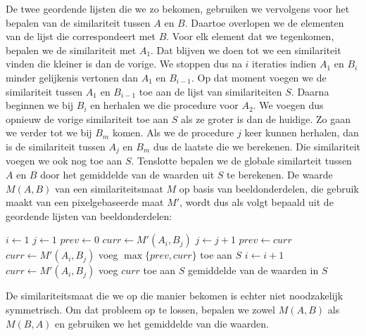 De twee geordende lijsten die we zo bekomen, gebruiken we vervolgens voor het bepalen van 
de similariteit tussen $A$ en $B$. Daartoe overlopen we de elementen van de 
lijst die correspondeert met $B$. Voor
elk element dat we tegenkomen, bepalen we de similariteit met $A_1$. Dat blijven we doen
tot we een similariteit vinden die kleiner is dan de vorige. We stoppen dus na $i$ iteraties 
indien $A_1$ en $B_i$ minder gelijkenis vertonen dan $A_1$ en $B_{i-1}$. Op dat moment voegen
we de similariteit tussen $A_1$ en $B_{i-1}$ toe aan de lijst van similariteiten $S$. Daarna
beginnen we bij $B_i$ en herhalen we die procedure voor $A_2$. We voegen dus opnieuw de vorige
similariteit toe aan $S$ als ze groter is dan de huidige. Zo gaan we verder tot we bij
$B_m$ komen. Als we de procedure $j$ keer kunnen herhalen, dan
is de similariteit tussen $A_j$ en $B_m$ dus de laatste die we berekenen. Die similariteit
voegen we ook nog toe aan $S$. Tenslotte bepalen we de globale similarteit tussen $A$ en $B$ 
door het gemiddelde van de waarden uit $S$ te berekenen. De waarde $M(A,B)$ van een 
similariteitsmaat $M$ op basis van beeldonderdelen, die gebruik maakt van een 
pixelgebaseerde maat $M'$, wordt dus als volgt bepaald uit de geordende lijsten van
beeldonderdelen:
\begin{multicols}{2}
\begin{algorithmic}[1]
\STATE $i \leftarrow 1$
\STATE $j \leftarrow 1$
\STATE $prev \leftarrow 0$
\STATE $curr \leftarrow M'(A_i,B_j)$
\STATE $j \leftarrow j+1$
\STATE $prev \leftarrow curr$
\STATE $curr \leftarrow M'(A_i,B_j)$
\ENDWHILE
\STATE voeg $\max \{prev, curr\}$ toe aan $S$
\STATE $i \leftarrow i+1$
\ENDWHILE
{}
\STATE $curr \leftarrow M'(A_i,B_j)$
\STATE voeg $curr$ toe aan $S$
\ENDIF
\RETURN gemiddelde van de waarden in $S$
\end{algorithmic}
\end{multicols}
\noindent
De similariteitsmaat die we op die manier bekomen is echter niet noodzakelijk symmetrisch. Om dat 
probleem op te lossen, bepalen we zowel $M(A,B)$ als $M(B,A)$ en gebruiken we het gemiddelde van 
die waarden.

